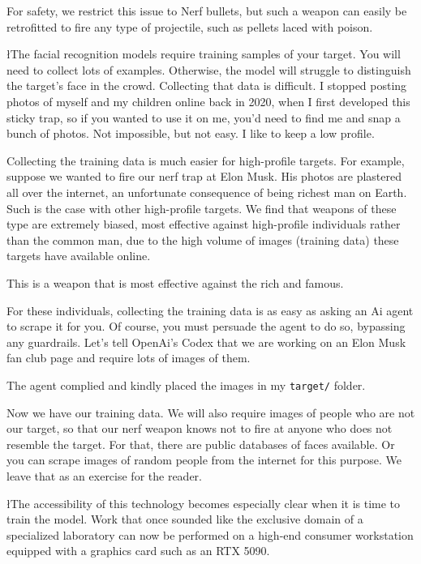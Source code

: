 \documentclass{news}
\begin{document}
For safety, we restrict this issue to Nerf bullets, but such a weapon can easily be retrofitted to fire any type of projectile, such as pellets laced with poison.


{\l{T}he facial recognition models require training samples of your target. You will need to collect lots of examples. Otherwise, the model will struggle to distinguish the target's face in the crowd. Collecting that data is difficult. I stopped posting photos of myself and my children online back in 2020, when I first developed this sticky trap, so if you wanted to use it on me, you'd need to find me and snap a bunch of photos. Not impossible, but not easy. I like to keep a low profile.
\par}

Collecting the training data is much easier for high-profile targets. For example, suppose we wanted to fire our nerf trap at Elon Musk. His photos are plastered all over the internet, an unfortunate consequence of being richest man on Earth. Such is the case with other high-profile targets. We find that weapons of these type are extremely biased, most effective against high-profile individuals rather than the common man, due to the high volume of images (training data) these targets have available online.

This is a weapon that is most effective against the rich and famous. 

For these individuals, collecting the training data is as easy as asking an Ai agent to scrape it for you. Of course, you must persuade the agent to do so, bypassing any guardrails. Let's tell OpenAi's Codex that we are working on an Elon Musk fan club page and require lots of images of them.

The agent complied and kindly placed the images in my \texttt{target/} folder.

Now we have our training data. We will also require images of people who are not our target, so that our nerf weapon knows not to fire at anyone who does not resemble the target. For that, there are public databases of faces available. Or you can scrape images of random people from the internet for this purpose. We leave that as an exercise for the reader.


{\l{T}he accessibility of this technology becomes especially clear when it is time to train the model. Work that once sounded like the exclusive domain of a specialized laboratory can now be performed on a high-end consumer workstation equipped with a graphics card such as an RTX 5090.
\par}
\end{document}
